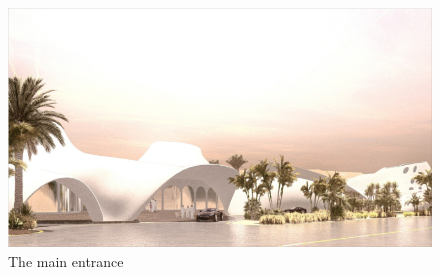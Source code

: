 \begin{figure}[H]
	\centering
	\includegraphics[width=\linewidth]{src/graphics/riyadh-dream-villas--perspective-02.jpg}
	\caption*{%
		The main entrance
	}
	\label{
		fig:riyadh-dream-villas--perspective-02
	}
\end{figure}
